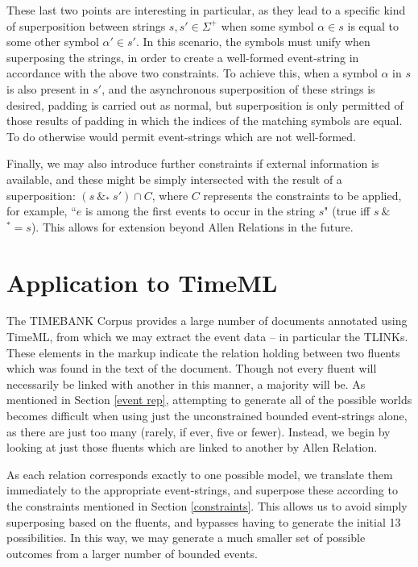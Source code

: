 \documentclass[a4paper,11pt,leqno]{article}
\makeatletter
\newcommand{\vph}[1]{\vphantom{#1}}
\newcommand{\eboxb}[1]{\fbox{$\vph{@}#1$}}
\makeatother
\begin{document}
These last two points are interesting in particular, as they lead to a specific 
kind of superposition between strings $s, s' \in \Sigma^+$ when some 
symbol $\alpha \in s$ is equal to some other symbol $\alpha' \in s'$. In this 
scenario, the symbols must unify when superposing the strings, in order to 
create a well-formed event-string in accordance with the above two constraints. 
To achieve this, when a symbol $\alpha$ in $s$ is also present in $s'$, and the 
asynchronous superposition of these strings is desired, padding is carried out 
as normal, but superposition is only permitted of those results of padding 
in which the indices of the matching symbols are equal. To do otherwise would 
permit event-strings which are not well-formed.

Finally, we may also introduce further constraints if external 
information is 
available, and these might be simply intersected with the result of a 
superposition: $(s\ \&_* \ s') \cap C$, where $C$ represents the constraints to 
be applied, for example, ``$e$ is among the first events to occur in the string 
$s$" (true iff $s ~\&~ $\eboxb{}\eboxb{e}\eboxb{}$^\ast = s$). This allows for 
extension 
beyond Allen Relations in the 
future.

\section{Application to TimeML}\label{application}
The TIMEBANK Corpus \citep{pustejovsky2003timebank} provides a large number of 
documents annotated using TimeML, from which we may extract the event data -- 
in particular the TLINKs. These elements in the markup indicate the relation 
holding between two fluents which was found in the text of the document. Though 
not every fluent will necessarily be linked with another in this manner, a 
majority will be.  As mentioned in Section \ref{event rep}, attempting to 
generate all of the possible worlds becomes difficult when using just the 
unconstrained bounded event-strings alone, as there are just too many (rarely, 
if ever, five or fewer). Instead, we begin by looking at just those fluents 
which are linked to another by Allen Relation.

As each relation corresponds exactly to one possible model, we translate them 
immediately to the appropriate event-strings, and superpose these according to 
the constraints mentioned in Section \ref{constraints}. This allows us to avoid 
simply superposing based on the fluents, and bypasses having to generate the 
initial 13 possibilities. In this way, we may generate a much smaller set of 
possible outcomes from a larger number of bounded events.
\end{document}

